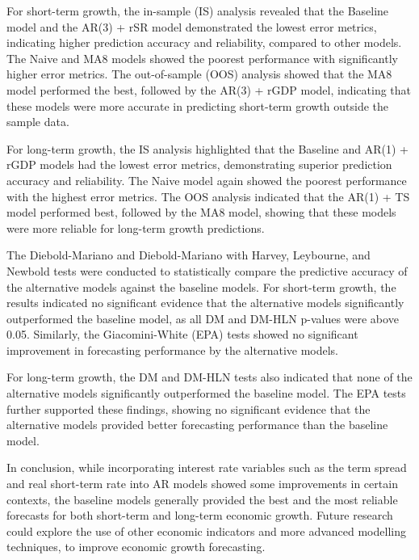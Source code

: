 \documentclass[12pt]{article}
\begin{document}
For short-term growth, the in-sample (IS) analysis revealed that the Baseline model and the AR(3) + rSR model demonstrated the lowest error metrics, indicating higher prediction accuracy and reliability, compared to other models. The Naive and MA8 models showed the poorest performance with significantly higher error metrics. The out-of-sample (OOS) analysis showed that the MA8 model performed the best, followed by the AR(3) + rGDP model, indicating that these models were more accurate in predicting short-term growth outside the sample data.

For long-term growth, the IS analysis highlighted that the Baseline and AR(1) + rGDP models had the lowest error metrics, demonstrating superior prediction accuracy and reliability. The Naive model again showed the poorest performance with the highest error metrics. The OOS analysis indicated that the AR(1) + TS model performed best, followed by the MA8 model, showing that these models were more reliable for long-term growth predictions.

The Diebold-Mariano and Diebold-Mariano with Harvey, Leybourne, and Newbold tests were conducted to statistically compare the predictive accuracy of the alternative models against the baseline models. For short-term growth, the results indicated no significant evidence that the alternative models significantly outperformed the baseline model, as all DM and DM-HLN p-values were above 0.05. Similarly, the Giacomini-White (EPA) tests showed no significant improvement in forecasting performance by the alternative models.

For long-term growth, the DM and DM-HLN tests also indicated that none of the alternative models significantly outperformed the baseline model. The EPA tests further supported these findings, showing no significant evidence that the alternative models provided better forecasting performance than the baseline model.

In conclusion, while incorporating interest rate variables such as the term spread and real short-term rate into AR models showed some improvements in certain contexts, the baseline models generally provided the best and the most reliable forecasts for both short-term and long-term economic growth. Future research could explore the use of other economic indicators and more advanced modelling techniques, to improve economic growth forecasting.

\newpage
\end{document}
